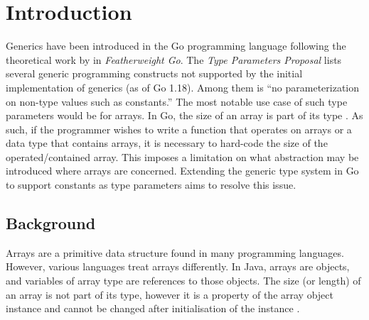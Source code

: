 \section{Introduction}

Generics have been introduced in the Go programming language following the
theoretical work by \cite{fg} in \emph{Featherweight Go}. The \emph{Type
    Parameters Proposal} lists several generic programming constructs not supported
by the initial implementation of generics (as of Go 1.18). Among them is ``no
parameterization on non-type values such as constants.''
\autocite{genericsProposal} The most notable use case of such type parameters
would be for arrays. In Go, the size of an array is part of its type
\autocite{spec}. As such, if the programmer wishes to write a function that
operates on arrays or a data type that contains arrays, it is necessary to
hard-code the size of the operated/contained array. This imposes a limitation on
what abstraction may be introduced where arrays are concerned. Extending the
generic type system in Go to support constants as type parameters aims to
resolve this issue.

\subsection{Background}

Arrays are a primitive data structure found in many programming languages.
However, various languages treat arrays differently. In Java, arrays are
objects, and variables of array type are references to those objects. The size
(or length) of an array is not part of its type, however it is a property of the
array object instance and cannot be changed after initialisation of the instance
\autocite{javaSpec}.



